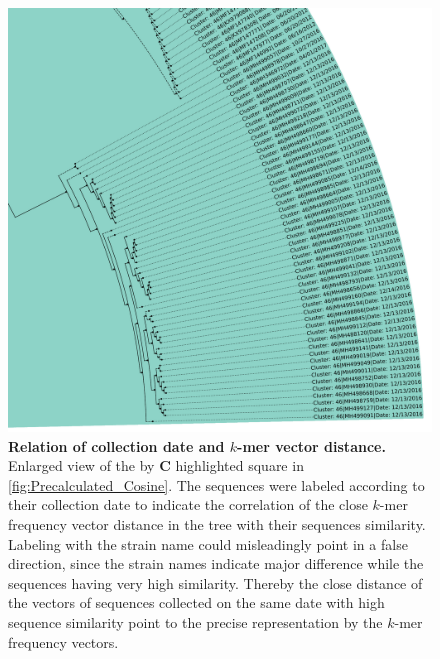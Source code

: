 \begin{figure}[!hbt]
    \centering
    \includegraphics[width=\textwidth]{Graphics/identical.pdf}
    \caption[Relation of collection date and $k$-mer vector distance]{\textbf{Relation of collection date and $k$-mer vector distance.} Enlarged view of the by \textbf{\textsf{C}} highlighted square in \autoref{fig:Precalculated_Cosine}. The sequences were labeled according to their collection date to indicate the correlation of the close $k$-mer frequency vector distance in the tree with their sequences similarity. Labeling with the strain name could misleadingly point in a false direction, since the strain names indicate major difference while the sequences having very high similarity. Thereby the close distance of the vectors of sequences collected on the same date with high sequence similarity point to the precise representation by the $k$-mer frequency vectors.}
    \label{fig:focus}
\end{figure}

